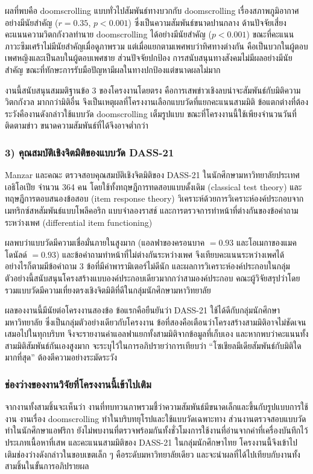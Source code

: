 ผลที่พบคือ doomscrolling แบบทั่วไปสัมพันธ์ทางบวกกับ doomscrolling เรื่องสภาพภูมิอากาศ
อย่างมีนัยสำคัญ ($r = 0.35$, $p < 0.001$) ซึ่งเป็นความสัมพันธ์ขนาดปานกลาง
ด้านปัจจัยเสี่ยง คะแนนความวิตกกังวลทำนาย doomscrolling ได้อย่างมีนัยสำคัญ ($p < 0.001$)
ขณะที่คะแนนภาวะซึมเศร้าไม่มีนัยสำคัญเมื่อดูภาพรวม
แต่เมื่อแยกตามเพศพบว่าทิศทางต่างกัน คือเป็นบวกในผู้ตอบเพศหญิงและเป็นลบในผู้ตอบเพศชาย
ส่วนปัจจัยปกป้อง การสนับสนุนทางสังคมไม่มีผลอย่างมีนัยสำคัญ
ขณะที่ทักษะการรับมือปัญหามีผลในทางปกป้องแต่ขนาดผลไม่มาก

งานนี้สนับสนุนสมมติฐานข้อ 3 ของโครงงานโดยตรง คือการเสพข่าวเชิงลบน่าจะสัมพันธ์กับมิติความวิตกกังวล
มากกว่ามิติอื่น จึงเป็นเหตุผลที่โครงงานเลือกแบบวัดที่แยกคะแนนสามมิติ
ข้อแตกต่างที่ต้องระวังคืองานดังกล่าวใช้แบบวัด doomscrolling เต็มรูปแบบ
ขณะที่โครงงานนี้ใช้เพียงจำนวนวันที่ติดตามข่าว ขนาดความสัมพันธ์ที่ได้จึงอาจต่ำกว่า

\subsubsection*{3) คุณสมบัติเชิงจิตมิติของแบบวัด DASS-21}

Manzar และคณะ \cite{manzar2025dass21} ตรวจสอบคุณสมบัติเชิงจิตมิติของ DASS-21
ในนักศึกษามหาวิทยาลัยประเทศเอธิโอเปีย จำนวน 364 คน
โดยใช้ทั้งทฤษฎีการทดสอบแบบดั้งเดิม (classical test theory) และทฤษฎีการตอบสนองข้อสอบ (item response theory)
วิเคราะห์ด้วยการวิเคราะห์องค์ประกอบจากเมทริกซ์สหสัมพันธ์แบบโพลีคอริก แบบจำลองราสช์
และการตรวจการทำหน้าที่ต่างกันของข้อคำถามระหว่างเพศ (differential item functioning)

ผลพบว่าแบบวัดมีความเชื่อมั่นภายในสูงมาก (แอลฟาของครอนบาค $= 0.93$ และโอเมกาของแมคโดนัลด์ $= 0.93$)
และข้อคำถามทำหน้าที่ไม่ต่างกันระหว่างเพศ จึงเทียบคะแนนระหว่างเพศได้
อย่างไรก็ตามมีข้อคำถาม 3 ข้อที่มีค่าพารามิเตอร์ไม่ดีนัก
และผลการวิเคราะห์องค์ประกอบในกลุ่มตัวอย่างนี้สนับสนุนโครงสร้างแบบองค์ประกอบเดียวมากกว่าสามองค์ประกอบ
คณะผู้วิจัยสรุปว่าโดยรวมแบบวัดมีความเที่ยงตรงเชิงจิตมิติที่ดีในกลุ่มนักศึกษามหาวิทยาลัย

ผลของงานนี้มีนัยต่อโครงงานสองข้อ ข้อแรกคือยืนยันว่า DASS-21 ใช้ได้ดีกับกลุ่มนักศึกษามหาวิทยาลัย
ซึ่งเป็นกลุ่มตัวอย่างเดียวกับโครงงาน ข้อที่สองคือเตือนว่าโครงสร้างสามมิติอาจไม่ชัดเจนเสมอไปในทุกบริบท
จึงจะรายงานค่าแอลฟาแยกทั้งสามมิติจากข้อมูลที่เก็บเอง
และหากพบว่าคะแนนทั้งสามมิติสัมพันธ์กันเองสูงมาก จะระบุไว้ในการอภิปรายว่าการเทียบว่า
``โซเชียลมีเดียสัมพันธ์กับมิติใดมากที่สุด'' ต้องตีความอย่างระมัดระวัง

\subsubsection*{ช่องว่างของงานวิจัยที่โครงงานนี้เข้าไปเติม}

จากงานทั้งสามชิ้นจะเห็นว่า งานที่ทบทวนภาพรวมชี้ว่าความสัมพันธ์มีขนาดเล็กและขึ้นกับรูปแบบการใช้งาน
งานเรื่อง doomscrolling ทำในบริบทยุโรปและใช้แบบวัดเฉพาะทาง
ส่วนงานตรวจสอบแบบวัดทำในนักศึกษาแอฟริกา
ยังไม่พบงานที่ตรวจพร้อมกันทั้งชั่วโมงการใช้งานที่อ่านจากค่าที่เครื่องบันทึกไว้ ประเภทเนื้อหาที่เสพ
และคะแนนสามมิติของ DASS-21 ในกลุ่มนักศึกษาไทย
โครงงานนี้จึงเข้าไปเติมช่องว่างดังกล่าวในขอบเขตเล็ก ๆ คือระดับมหาวิทยาลัยเดียว
และจะนำผลที่ได้ไปเทียบกับงานทั้งสามชิ้นในขั้นการอภิปรายผล
